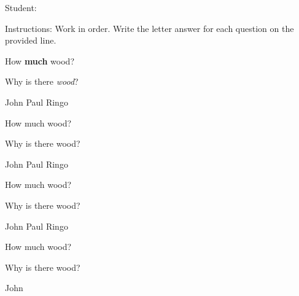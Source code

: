 \documentclass[addpoints, 10pt, answers]{exam}
\begin{document}
\pagestyle{headandfoot}
\firstpageheadrule
{}
{\setlength\fillinlinelength{1.5in} Student: \fillin{}\\}
\runningheadrule
{}
{}{
{\iflastpage
{
}{}}
}
{\begin{center}
Instructions:  Work in order.  Write the letter answer for each question on the provided line. 
\end{center}
\setlength\answerlinelength{0.5in}
\setlength\answerskip{-0.25in}
\begin{questions}
\question[3] How \textbf{much} wood?
\begin{choices}
\answerline
\end{choices}
\question[1] Why is there \textit{wood}?
\begin{choices}
\choice John
\CorrectChoice Paul
\choice Ringo
\end{choices}
\question[3] How much wood?
\begin{choices}
\answerline
\end{choices}
\question[1] Why is there wood?
\begin{choices}
\choice John
\CorrectChoice Paul
\choice Ringo
\end{choices}
\question[3] How much wood?
\begin{choices}
\answerline
\end{choices}
\question[1] Why is there wood?
\begin{choices}
\choice John
\CorrectChoice Paul
\choice Ringo
\end{choices}
\question[3] How much wood?
\begin{choices}
\answerline
\end{choices}
\question[1] Why is there wood?
\begin{choices}
\choice John

\end{choices}
\end{questions}}
\end{document}
